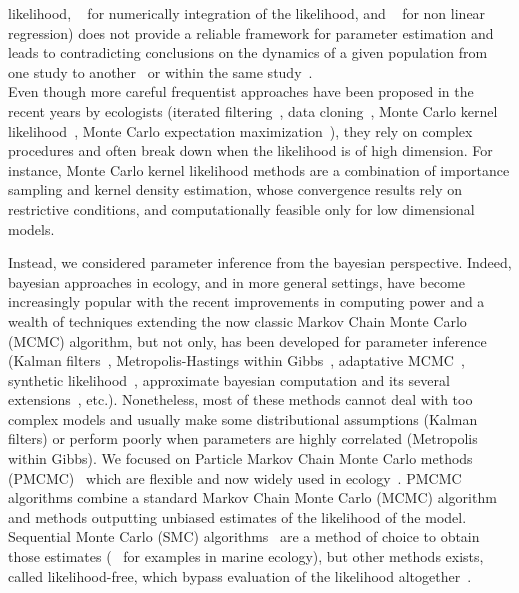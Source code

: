 \documentclass[12pt]{article}
\begin{document}
	likelihood, ~\cite{de2002fitting} for numerically integration of the likelihood, and ~\cite{yang2008importance} for non linear regression) does not provide a reliable framework for parameter estimation and leads to contradicting conclusions on the dynamics of a given population from one study to another~\cite{sibly2005regulation, saether2002pattern} or within the same study~\cite{de2002fitting}. \\
	Even though more careful frequentist approaches have been proposed in the recent years by ecologists (iterated filtering~\cite{ionides2006inference}, data cloning~\cite{lele2007data}, Monte Carlo kernel likelihood~\cite{valpine2005state}, Monte Carlo
	expectation maximization~\cite{booth1999maximizing}), they rely on complex procedures and often break down when the likelihood is of high dimension. For instance, Monte Carlo kernel likelihood methods are a combination of importance sampling and kernel density estimation, whose convergence results rely on restrictive conditions, and computationally feasible only for low dimensional models.
	
	Instead, we considered parameter inference from the bayesian perspective. 
	Indeed, bayesian approaches in ecology, and in more general settings, have become increasingly popular with the recent improvements in computing power and a wealth of techniques extending the now classic Markov Chain Monte Carlo (MCMC) algorithm, but not only, has been developed for parameter inference (Kalman filters~\cite{sorenson1960kalman}, Metropolis-Hastings within Gibbs~\cite{geweke2001bayesian}, adaptative MCMC~\cite{Andrieu2008}, synthetic likelihood~\cite{wood2010statistical}, approximate bayesian computation and its several extensions~\cite{marin2012approximate}, etc.). Nonetheless, most of these methods cannot deal with too complex models and usually make some distributional assumptions (Kalman filters) or perform poorly when parameters are highly correlated (Metropolis within Gibbs). We focused on Particle Markov Chain Monte Carlo methods (PMCMC)~\cite{andrieu2010particle} which are flexible and now widely used in ecology~\cite{peters2010ecological, gao2012bayesian, fasiolo2014statistical}. PMCMC algorithms combine a standard Markov Chain Monte Carlo (MCMC) algorithm and methods outputting unbiased estimates of the likelihood of the model. Sequential Monte Carlo (SMC) algorithms~\cite{del2004feynman} are a method of choice to obtain those estimates (~\cite{losa2003sequential, dowd2006sequential, jones2010bayesian} for examples in marine ecology), but other methods exists, called likelihood-free, which bypass evaluation of the likelihood altogether~\cite{toni2009approximate}.
	
\end{document}
